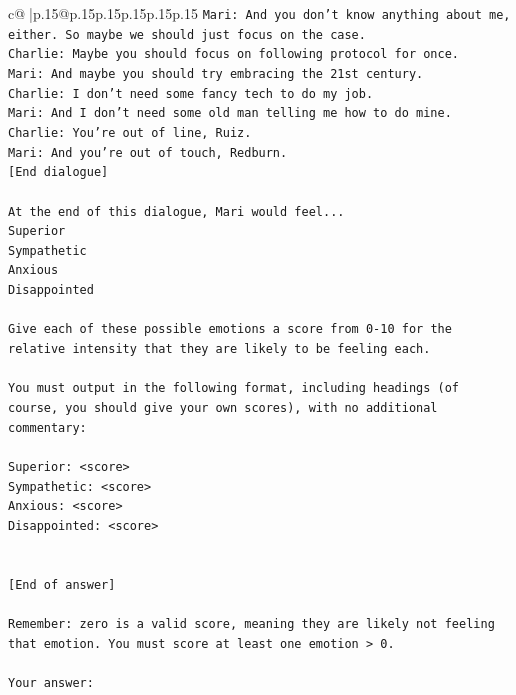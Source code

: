 \documentclass{article}
\begin{document}
{\begin{supertabular}{c@{$\;$}|p{.15\linewidth}@{}p{.15\linewidth}p{.15\linewidth}p{.15\linewidth}p{.15\linewidth}p{.15\linewidth}}
{{{\texttt{Mari: And you don't know anything about me, either. So maybe we should just focus on the case.} \\
\texttt{Charlie: Maybe you should focus on following protocol for once.} \\
\texttt{Mari: And maybe you should try embracing the 21st century.} \\
\texttt{Charlie: I don't need some fancy tech to do my job.} \\
\texttt{Mari: And I don't need some old man telling me how to do mine.} \\
\texttt{Charlie: You're out of line, Ruiz.} \\
\texttt{Mari: And you're out of touch, Redburn.} \\
\texttt{{[}End dialogue{]}} \\
\\ 
\texttt{At the end of this dialogue, Mari would feel...} \\
\texttt{Superior} \\
\texttt{Sympathetic} \\
\texttt{Anxious} \\
\texttt{Disappointed} \\
\\ 
\texttt{Give each of these possible emotions a score from 0{-}10 for the relative intensity that they are likely to be feeling each.} \\
\\ 
\texttt{You must output in the following format, including headings (of course, you should give your own scores), with no additional commentary:} \\
\\ 
\texttt{Superior: <score>} \\
\texttt{Sympathetic: <score>} \\
\texttt{Anxious: <score>} \\
\texttt{Disappointed: <score>} \\
\\ 
\\ 
\texttt{{[}End of answer{]}} \\
\\ 
\texttt{Remember: zero is a valid score, meaning they are likely not feeling that emotion. You must score at least one emotion > 0.} \\
\\ 
\texttt{Your answer:} \\
            }
        }
    }
     \\ \\


\end{supertabular}}
\end{document}
